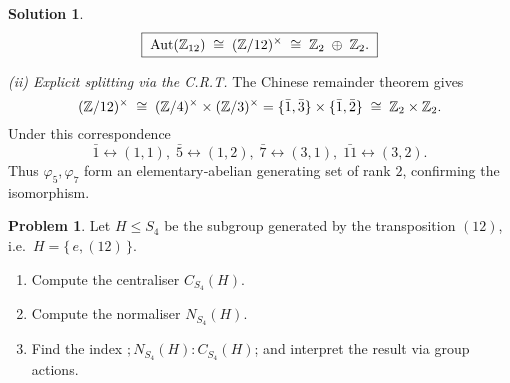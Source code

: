 \documentclass[12pt]{article}
\DeclareMathOperator{\Aut}{Aut}
\theoremstyle{definition} %
\newtheorem{solution}{Solution}
\newtheorem{problem}{Problem}
\theoremstyle{plain} %
\begin{document}
\begin{solution}
                \[
                   \boxed{\;
                      \Aut(\Bbb Z_{12})\;\cong\;(\Bbb Z/12)^{\times}
                      \;\cong\;\Bbb Z_{2}\;\oplus\;\Bbb Z_{2}.
                   \;}
                \]
                
                \smallskip
                \emph{(ii) Explicit splitting via the C.R.T.}\;
                The Chinese remainder theorem gives
                \[
                   (\Bbb Z/12)^{\times}
                      \;\cong\;
                   (\Bbb Z/4)^{\times}\times(\Bbb Z/3)^{\times}
                      =\{\bar1,\bar3\}\times\{\bar1,\bar2\}
                      \;\cong\;\Bbb Z_{2}\times\Bbb Z_{2}.
                \]
                Under this correspondence
                \[
                   \bar1\longleftrightarrow(1,1),\;
                   \bar5\longleftrightarrow(1,2),\;
                   \bar7\longleftrightarrow(3,1),\;
                   \bar{11}\longleftrightarrow(3,2).
                \]
                Thus
                \(
                   \varphi_{5},\varphi_{7}
                \)
                form an elementary‐abelian generating set of rank $2$, confirming the
                isomorphism.
                
                \end{solution}
                \begin{problem}
                  Let \(H\le S_{4}\) be the subgroup generated by the transposition
                  \((12)\), i.e.\ \(H=\{\,e,(12)\,\}\).
                  \begin{enumerate}[]
                     \item Compute the centraliser \(C_{S_{4}}(H)\).
                     \item Compute the normaliser \(N_{S_{4}}(H)\).
                     \item Find the index \(;N_{S_{4}}(H):C_{S_{4}}(H)\); and interpret the
                           result via group actions.
                  \end{enumerate}
                  \end{problem}
                  
\end{document}
